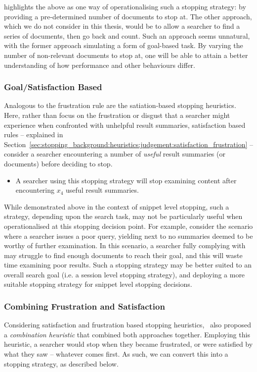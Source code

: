 \cite{cooper1973retrieval_effectiveness_ii} highlights the above as one way of operationalising such a stopping strategy: by providing a pre-determined number of documents to stop at. The other approach, which we do not consider in this thesis, would be to allow a searcher to find a series of documents, then go back and count. Such an approach seems unnatural, with the former approach simulating a form of goal-based task. By varying the number of non-relevant documents to stop at, one will be able to attain a better understanding of how performance and other behaviours differ.

\subsubsection{Goal/Satisfaction Based}
Analogous to the frustration rule are the satiation-based stopping heuristics. Here, rather than focus on the frustration or disgust that a searcher might experience when confronted with unhelpful result summaries, satisfaction based rules -- explained in Section~\ref{sec:stopping_background:heuristics:judgement:satisfaction_frustration} -- consider a searcher encountering a number of \emph{useful} result summaries (or documents) before deciding to stop.

\begin{itemize}
    \item[\blueboxbold{SS4}] A searcher using this stopping strategy will stop examining content after encountering $x_4$ useful result summaries.
\end{itemize}

While demonstrated above in the context of snippet level stopping, such a strategy, depending upon the search task, may not be particularly useful when operationalised at this stopping decision point. For example, consider the scenario where a searcher issues a poor query, yielding next to no summaries deemed to be worthy of further examination. In this scenario, a searcher fully complying with  may struggle to find enough documents to reach their goal, and this will waste time examining poor results. Such a stopping strategy may be better suited to an overall search goal (i.e. a session level stopping strategy), and deploying a more suitable stopping strategy for snippet level stopping decisions.


\subsubsection{Combining Frustration and Satisfaction}
Considering satisfaction and frustration based stopping heuristics,~\citealt{kraft1979stopping_rules} also proposed a \emph{combination heuristic} that combined both approaches together. Employing this heuristic, a searcher would stop when they became frustrated, or were satisfied by what they saw -- whatever comes first. As such, we can convert this into a stopping strategy, as described below.

